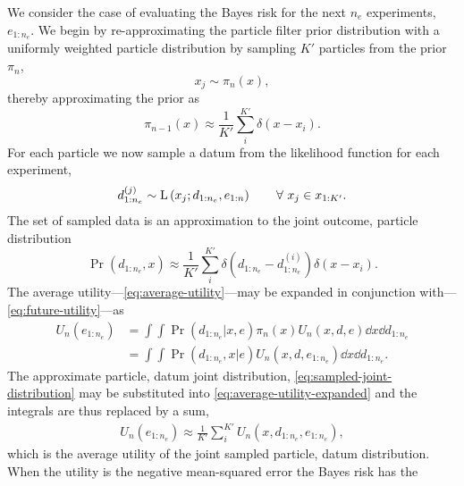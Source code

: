 \documentclass[aps,nofootinbib,twocolumn,superscriptaddress]{revtex4}
\newcommand{\mps}{x}
\newcommand{\eps}{e}
\newcommand{\data}{d}
\begin{document}
We consider the case of evaluating the Bayes risk for the next $n_e$
experiments, $\eps_{1:n_e}$.
We begin by re-approximating the particle filter prior distribution with a
uniformly weighted particle distribution by sampling $K'$ particles from the
prior $\pi_{n}$,
\begin{equation}
    \mps_j \sim \pi_{n}(\mps),
\end{equation}
thereby approximating the prior as
\begin{equation}
    \pi_{n-1}(\mps) \approx \frac{1}{K'}
        \sum \limits_{i}^{K'}\delta \left(\mps-\mps_i\right).
    \label{eq:approx_particle_filter}
\end{equation}
For each particle we now sample a datum from the likelihood function for each
experiment,
\begin{equation}
    \data_{1:n_e}^{(j)} \sim
        \Lhood \left(
            \mps_j;\data_{1:n_e},\eps_{1:n}
        \right)
        \quad\quad \forall \ \mps_j \in \mps_{1:K'}.
\end{equation}
The set of sampled data is an approximation to the joint outcome, particle
distribution
\begin{equation}
    \Pr(\data_{1:n_e},\mps) \approx
        \frac{1}{K'}\sum \limits_{i}^{K'} \delta \left(
            \data_{1:n_e}-\data_{1:n_e}^{(i)}\right)\delta\left(\mps-\mps_i
        \right).
    \label{eq:sampled-joint-distribution}
\end{equation}
The average utility---\autoref{eq:average-utility}---may be expanded in
conjunction with---\autoref{eq:future-utility}---as
\begin{align}
    U_n(\eps_{1:n_e})
        &= \int\int \Pr(\data_{1:n_e}|\mps,\eps)\pi_n(\mps)
            U_n(\mps,\data,\eps)\dd\mps \dd\data_{1:n_e} \nonumber \\
        &= \int\int \Pr(\data_{1:n_e},\mps|\eps)
            U_n(\mps,\data,\eps_{1:n_e})\dd\mps \dd\data_{1:n_e}.
\label{eq:average-utility-expanded}
\end{align}
The approximate particle, datum joint distribution,
\eqref{eq:sampled-joint-distribution} may be substituted into
\eqref{eq:average-utility-expanded} and the integrals are thus replaced by a
sum,
\begin{align}
    U_n(\eps_{1:n_e}) \approx
        \frac{1}{K'} \sum \limits_i^{K'} U_n(\mps,\data_{1:n_e},\eps_{1:n_e}),
\end{align}
which is the average utility of the joint sampled particle, datum distribution.
When the utility is the negative mean-squared error the Bayes risk has the
\end{document}
